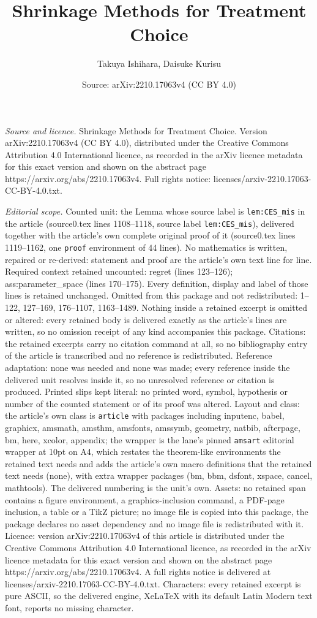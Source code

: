 \documentclass[10pt,a4paper]{amsart}
\title[Shrinkage Methods for Treatment Choice]{Shrinkage Methods for Treatment Choice}
\author{Takuya Ishihara, Daisuke Kurisu}
\date{Source: arXiv:2210.17063v4 (CC BY 4.0)}
\begin{document}
\maketitle

\noindent\emph{Source and licence.} Shrinkage Methods for Treatment Choice. Version arXiv:2210.17063v4 (CC BY 4.0), distributed under the Creative Commons Attribution 4.0 International licence, as recorded in the arXiv licence metadata for this exact version and shown on the abstract page https://arxiv.org/abs/2210.17063v4. Full rights notice: licenses/arxiv-2210.17063-CC-BY-4.0.txt.\par\smallskip

\noindent\textit{Editorial scope.} Counted unit: the Lemma whose source label is \texttt{lem:CES\_mis} in the article (source0.tex lines 1108--1118, source label \texttt{lem:CES\_mis}), delivered together with the article's own complete original proof of it (source0.tex lines 1119--1162, one \texttt{proof} environment of 44 lines). No mathematics is written, repaired or re-derived: statement and proof are the article's own text line for line. Required context retained uncounted: regret (lines 123--126); ass:parameter\_space (lines 170--175). Every definition, display and label of those lines is retained unchanged. Omitted from this package and not redistributed: 1--122, 127--169, 176--1107, 1163--1489. Nothing inside a retained excerpt is omitted or altered: every retained body is delivered exactly as the article's lines are written, so no omission receipt of any kind accompanies this package. Citations: the retained excerpts carry no citation command at all, so no bibliography entry of the article is transcribed and no reference is redistributed. Reference adaptation: none was needed and none was made; every reference inside the delivered unit resolves inside it, so no unresolved reference or citation is produced. Printed slips kept literal: no printed word, symbol, hypothesis or number of the counted statement or of its proof was altered. Layout and class: the article's own class is \texttt{article} with packages including inputenc, babel, graphicx, amsmath, amsthm, amsfonts, amssymb, geometry, natbib, afterpage, bm, here, xcolor, appendix; the wrapper is the lane's pinned \texttt{amsart} editorial wrapper at 10pt on A4, which restates the theorem-like environments the retained text needs and adds the article's own macro definitions that the retained text needs (none), with extra wrapper packages (bm, bbm, dsfont, xspace, cancel, mathtools). The delivered numbering is the unit's own. Assets: no retained span contains a figure environment, a graphics-inclusion command, a PDF-page inclusion, a table or a TikZ picture; no image file is copied into this package, the package declares no asset dependency and no image file is redistributed with it. Licence: version arXiv:2210.17063v4 of this article is distributed under the Creative Commons Attribution 4.0 International licence, as recorded in the arXiv licence metadata for this exact version and shown on the abstract page https://arxiv.org/abs/2210.17063v4. A full rights notice is delivered at licenses/arxiv-2210.17063-CC-BY-4.0.txt. Characters: every retained excerpt is pure ASCII, so the delivered engine, XeLaTeX with its default Latin Modern text font, reports no missing character.
\end{document}
